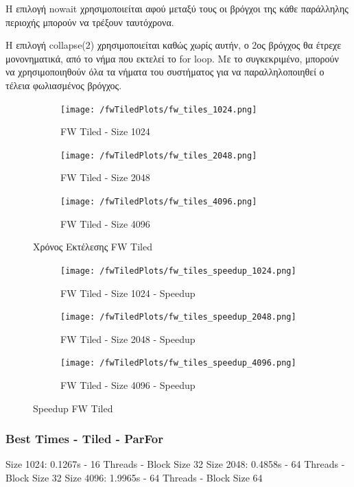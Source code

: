 \documentclass[../final_report.tex]{subfiles}
\begin{document}
Η επιλογή nowait χρησιμοποιείται αφού μεταξύ τους οι βρόγχοι της κάθε παράλληλης περιοχής
μπορούν να τρέξουν ταυτόχρονα. 

Η επιλογή collapse(2) χρησιμοποιείται καθώς χωρίς αυτήν, ο 2ος βρόγχος θα έτρεχε μονονηματικά,
από το νήμα που εκτελεί το for loop. Με το συγκεκριμένο, μπορούν να χρησιμοποιηθούν
όλα τα νήματα του συστήματος για να παραλληλοποιηθεί ο τέλεια φωλιασμένος βρόγχος.


\begin{figure}[H]
    \centering
    \begin{subfigure}[b]{0.48\linewidth}
        \texttt{[image: /fwTiledPlots/fw\_tiles\_1024.png]}
        \caption{FW Tiled - Size 1024}
    \end{subfigure}
    \begin{subfigure}[b]{0.48\linewidth}
        \texttt{[image: /fwTiledPlots/fw\_tiles\_2048.png]}
        \caption{FW Tiled - Size 2048}
    \end{subfigure}
    \begin{subfigure}[b]{0.5\linewidth}
        \texttt{[image: /fwTiledPlots/fw\_tiles\_4096.png]}
        \caption{FW Tiled - Size 4096}
    \end{subfigure}
    \caption{Χρόνος Εκτέλεσης FW Tiled}
    \label{fig:Χρόνος Εκτέλεσης FW Tiled}
\end{figure}

\begin{figure}[H]
    \centering
    \begin{subfigure}[b]{0.48\linewidth}
        \texttt{[image: /fwTiledPlots/fw\_tiles\_speedup\_1024.png]}
        \caption{FW Tiled - Size 1024 - Speedup}
    \end{subfigure}
    \begin{subfigure}[b]{0.48\linewidth}
        \texttt{[image: /fwTiledPlots/fw\_tiles\_speedup\_2048.png]}
        \caption{FW Tiled - Size 2048 - Speedup}
    \end{subfigure}
    \begin{subfigure}[b]{0.5\linewidth}
        \texttt{[image: /fwTiledPlots/fw\_tiles\_speedup\_4096.png]}
        \caption{FW Tiled - Size 4096 - Speedup}
    \end{subfigure}
    \caption{Speedup FW Tiled}
    \label{fig:Speedup FW Tiled}
\end{figure}

\subsubsection*{Best Times - Tiled - ParFor}
Size 1024: 0.1267s - 16 Threads - Block Size 32
\newline
Size 2048: 0.4858s - 64 Threads - Block Size 32
\newline
Size 4096: 1.9965s - 64 Threads - Block Size 64
\newline
\end{document}
